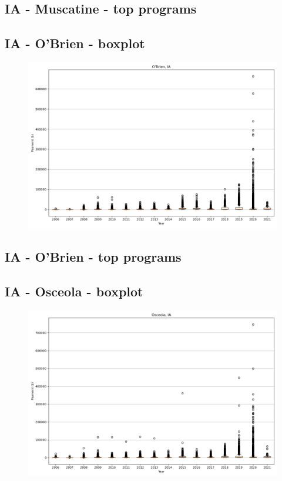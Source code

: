 \subsection*{IA - Muscatine - top programs}

\newpage
\subsection*{IA - O'Brien - boxplot}
\begin{figure}[h]
\centering
\includegraphics[width=7in]{../output/boxplots/counties/O'Brien-IA_boxplot.png}
\end{figure}


\subsection*{IA - O'Brien - top programs}

\newpage
\subsection*{IA - Osceola - boxplot}
\begin{figure}[h]
\centering
\includegraphics[width=7in]{../output/boxplots/counties/Osceola-IA_boxplot.png}
\end{figure}


